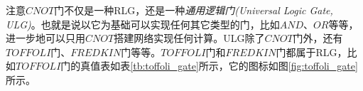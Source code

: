 



注意$CNOT$门不仅是一种RLG，还是一种\emph{通用逻辑门(Universal Logic Gate, ULG)}。也就是说以它为基础可以实现任何其它类型的门，比如$AND$、$OR$等等，进一步地可以只用$CNOT$搭建网络实现任何计算。ULG除了$CNOT$门外，还有$TOFFOLI$门\cite[]{Maslov_Dueck_Miller_2005}、$FREDKIN$门\cite[]{Adamatzky_2017}等等。$TOFFOLI$门和$FREDKIN$门都属于RLG，比如$TOFFOLI$门的真值表如表\ref{tb:toffoli_gate}所示，它的图标如图\ref{fig:toffoli_gate}所示。

